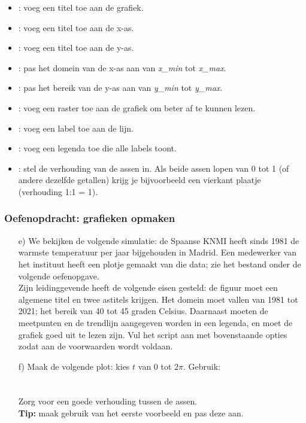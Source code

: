 \documentclass[a4paper,11pt, fleqn]{article}
\begin{document}
\begin{itemize}
	\setlength\itemsep{0em}
	\item {}: voeg een titel toe aan de grafiek.
	\item {}: voeg een titel toe aan de x-as.
	\item {}: voeg een titel toe aan de y-as.
	\item {}: pas het domein van de x-as aan van {\it x\_min} tot {\it x\_max}.
	\item {}: pas het bereik van de y-as aan van {\it y\_min} tot {\it y\_max}.
	\item {}: voeg een raster toe aan de grafiek om beter af te kunnen lezen.
	\item {}: voeg een label toe aan de lijn.
	\item {}: voeg een legenda toe die alle labels toont.
	\item {}: stel de verhouding van de assen in. Als beide assen lopen van 0 tot 1 (of andere dezelfde getallen) krijg je bijvoorbeeld een vierkant plaatje (verhouding 1:1 = 1).
\end{itemize}

\subsubsection*{Oefenopdracht: grafieken opmaken}
\begin{itemize}
	\item[e)] We bekijken de volgende simulatie: de Spaanse KNMI heeft sinds 1981 de warmste temperatuur per jaar bijgehouden in Madrid. Een medewerker van het instituut heeft een plotje gemaakt van die data; zie het bestand onder de volgende oefenopgave. \\
	Zijn leidinggevende heeft de volgende eisen gesteld: de figuur moet een algemene titel en twee astitels krijgen. Het domein moet vallen van 1981 tot 2021; het bereik van 40 tot 45 graden Celsius. Daarnaast moeten de meetpunten en de trendlijn aangegeven worden in een legenda, en moet de grafiek goed uit te lezen zijn. Vul het script aan met bovenstaande opties zodat aan de voorwaarden wordt voldaan.
	
	\item[f)] Maak de volgende plot: kies $t$ van $0$ tot $2\pi$. Gebruik: \\
	\\
	\\
	 Zorg voor een goede verhouding tussen de assen.\\
	 {\bf Tip:} maak gebruik van het eerste voorbeeld en pas deze aan.
\end{itemize}
\end{document}
